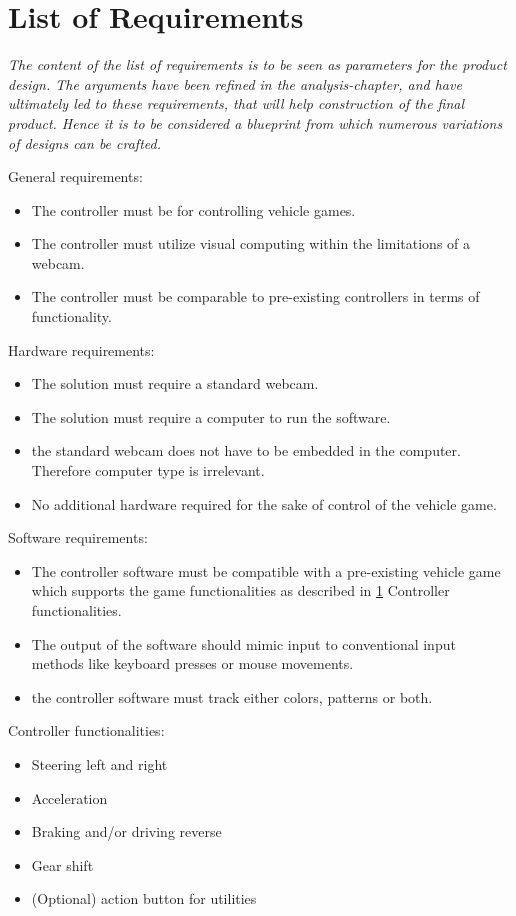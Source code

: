 \section{List of Requirements}
\label{LOR}

\textit{The content of the list of requirements is to be seen as parameters for the product design. The arguments have been refined in the analysis-chapter, and have ultimately led to these requirements, that will help construction of the final product. Hence it is to be considered a blueprint from which numerous variations of designs can be crafted.}
\bigskip

General requirements:
\begin{itemize}
\item The controller must be for controlling vehicle games.
\item The controller must utilize visual computing within the limitations of a webcam.
\item The controller must be comparable to pre-existing controllers in terms of functionality.
\end{itemize}
Hardware requirements:
\begin{itemize}
\item The solution must require a standard webcam.
\item The solution must require a computer to run the software.
\item the standard webcam does not have to be embedded in the computer. Therefore computer type is irrelevant.
\item No additional hardware required for the sake of control of the vehicle game.
\end{itemize}
Software requirements:
\begin{itemize}
\item The controller software must be compatible with a pre-existing vehicle game which supports the game functionalities as described in \ref{LOR} Controller functionalities. 
\item The output of the software should mimic input to conventional input methods like keyboard presses or mouse movements.
\item the controller software must track either colors, patterns or both.
\end{itemize}
Controller functionalities:
\begin{itemize}
\item Steering left and right
\item Acceleration
\item Braking and/or driving reverse
\item Gear shift
\item (Optional) action button for utilities 
\end{itemize}